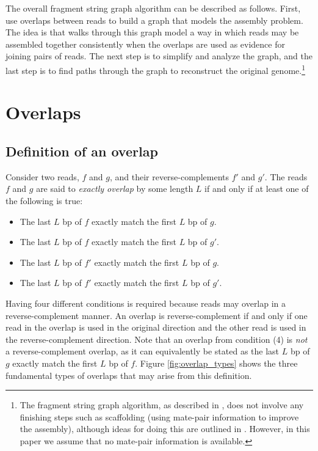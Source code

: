 \documentclass[10pt]{article}
\newcommand{\LengthVar}{L}
\newcommand{\Figure}[1]{Figure \ref{#1}}
\newcommand{\KeyTerm}[1]{{\it #1}}
\begin{document}
The overall fragment string graph algorithm can be described as follows.  First,
use overlaps between reads to build a graph that models the assembly problem.
The idea is that walks through this graph model a way in which reads may be
assembled together consistently when the overlaps are used as evidence for
joining pairs of reads.  The next step is to simplify and analyze the graph, and
the last step is to find paths through the graph to reconstruct the original
genome.\footnote{The fragment string graph algorithm, as described in
\cite{Myers2005}, does not involve any finishing steps such as scaffolding
(using mate-pair information to improve the assembly), although ideas for doing
this are outlined in \cite{Medvedev2009}.  However, in this paper we assume that
no mate-pair information is available.}

\section{Overlaps}

\subsection{Definition of an overlap}
	Consider two reads, $f$ and $g$, and their reverse-complements $f'$ and
	$g'$.  The reads $f$ and $g$ are said to \KeyTerm{exactly overlap} by some
	length $\LengthVar$ if and only if at least one of the following is true:
	\begin{itemize}
		\item The last $\LengthVar$ bp of $f$ exactly match the first
		$\LengthVar$ bp of $g$.
		\item The last $\LengthVar$ bp of $f$ exactly match the first
		$\LengthVar$ bp of $g'$.
		\item The last $\LengthVar$ bp of $f'$ exactly match the first
		$\LengthVar$ bp of $g$.
		\item The last $\LengthVar$ bp of $f'$ exactly match the first
		$\LengthVar$ bp of $g'$.
	\end{itemize}

Having four different conditions is required because reads may overlap in a
reverse-complement manner.  An overlap is reverse-complement if and only if one
read in the overlap is used in the original direction and the other read is used
in the reverse-complement direction.  Note that an overlap from condition (4) is
{\em not} a reverse-complement overlap, as it can equivalently be stated as the
last $\LengthVar$ bp of $g$ exactly match the first $\LengthVar$ bp of $f$.
\Figure{fig:overlap_types} shows the three fundamental types of overlaps that
may arise from this definition.
\end{document}
